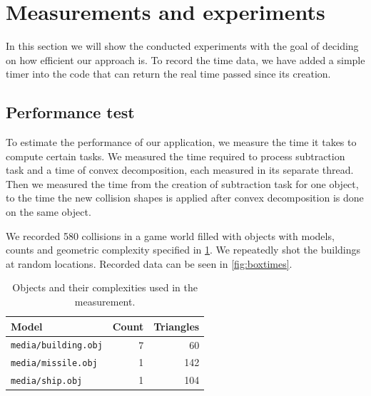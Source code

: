 \section{Measurements and experiments}
\label{sec:testing}
In this section we will  show the conducted experiments with the goal of deciding on how efficient our approach is.
To record the time data, we have added a simple timer into the code that can return the real time passed since its creation. 

\subsection{Performance test}
To estimate the performance of our application, we measure the time it takes to compute certain  tasks. We measured  the time required to process subtraction task and a time of convex decomposition, each measured in its separate thread. Then we measured the time from the creation of subtraction task for one object, to the time the new collision shapes is applied after convex decomposition is done on the same object. 

We recorded 580  collisions in a game world filled with objects with models, counts and
geometric complexity specified in \cref{tab:objects}. We repeatedly shot the buildings at random locations. Recorded data can be seen in \cref{fig:boxtimes}.

\begin{table}
 	\centering
\begin{tabular}{lrr}
  Model & Count & Triangles \\
  \hline
  \texttt{media/building.obj} & 7 & 60 \\
  \texttt{media/missile.obj} & 1 & 142 \\
  \texttt{media/ship.obj} & 1 & 104
\end{tabular}
\caption{Objects and their complexities used in the measurement.}
	\label{tab:objects}
\end{table}

